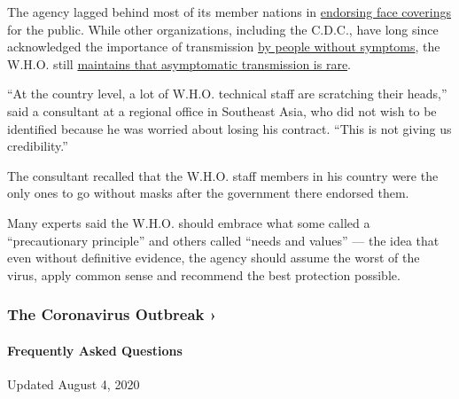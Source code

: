 The agency lagged behind most of its member nations in
\href{https://www.nytimes3xbfgragh.onion/2020/06/05/health/coronavirus-masks-who.html}{endorsing
face coverings} for the public. While other organizations, including the
C.D.C., have long since acknowledged the importance of transmission
\href{https://www.nytimes3xbfgragh.onion/2020/06/27/world/europe/coronavirus-spread-asymptomatic.html}{by
people without symptoms}, the W.H.O. still
\href{https://www.nytimes3xbfgragh.onion/2020/06/09/health/coronavirus-asymptomatic-world-health-organization.html}{maintains
that asymptomatic transmission is rare}.

``At the country level, a lot of W.H.O. technical staff are scratching
their heads,'' said a consultant at a regional office in Southeast Asia,
who did not wish to be identified because he was worried about losing
his contract. ``This is not giving us credibility.''

The consultant recalled that the W.H.O. staff members in his country
were the only ones to go without masks after the government there
endorsed them.

Many experts said the W.H.O. should embrace what some called a
``precautionary principle'' and others called ``needs and values'' ---
the idea that even without definitive evidence, the agency should assume
the worst of the virus, apply common sense and recommend the best
protection possible.

\href{https://www.nytimes3xbfgragh.onion/news-event/coronavirus?action=click\&pgtype=Article\&state=default\&region=MAIN_CONTENT_3\&context=storylines_faq}{}

\hypertarget{the-coronavirus-outbreak-}{%
\subsubsection{The Coronavirus Outbreak
›}\label{the-coronavirus-outbreak-}}

\hypertarget{frequently-asked-questions}{%
\paragraph{Frequently Asked
Questions}\label{frequently-asked-questions}}

Updated August 4, 2020


